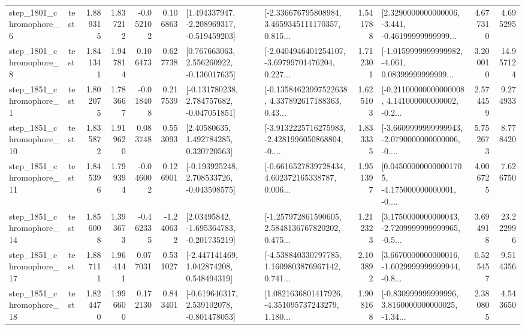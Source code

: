 \begin{tabular}{llrrrrllrlrr}
  step\_1801\_chromophore\_6 &      test &      1.889315 &    1.837212 &     -0.052102 &  0.106863 &   [1.494337947, -2.208969317, -0.519459203] &  [-2.336676795808984, 3.4659345111170357, 0.815... &       1.541788 &  [2.3290000000000006, -3.441, -0.46199999999999... &            4.677310 &          4.695295 \\
  step\_1801\_chromophore\_8 &      test &      1.841341 &    1.947814 &      0.106473 &  0.627738 &    [0.767663063, 2.556260922, -0.136017635] &  [-2.0404946401254107, -3.69799701476204, 0.227... &       1.712301 &  [-1.0159999999999982, -4.061, 0.08399999999999... &            3.200010 &         14.957124 \\
  step\_1851\_chromophore\_1 &      test &      1.802075 &    1.783667 &     -0.018408 &  0.217539 &   [-0.131780238, 2.784757682, -0.047051851] &  [-0.13584623997522638, 4.337892617188363, 0.43... &       1.625103 &  [-0.21100000000000008, 4.141000000000002, -0.2... &            2.574459 &          9.274933 \\
 step\_1851\_chromophore\_10 &      test &      1.835872 &    1.919620 &      0.083748 &  0.553093 &      [2.40580635, 1.492784285, 0.320720563] &  [-3.9132225716275983, -2.4281996050868804, -0.... &       1.833335 &  [-3.6609999999999943, -2.0790000000000006, -0.... &            5.752673 &          8.778420 \\
 step\_1851\_chromophore\_11 &      test &      1.845396 &    1.799394 &     -0.046002 &  0.126901 &   [-0.193925248, 2.708533726, -0.043598575] &  [-0.6616527839728434, 4.602372165338787, 0.006... &       1.951397 &  [0.045000000000001705, -4.175000000000001, -0.... &            4.006725 &          7.626750 \\
 step\_1851\_chromophore\_14 &      test &      1.856008 &    1.393673 &     -0.462335 & -1.240632 &    [2.03495842, -1.695364783, -0.201735219] &  [-1.257972861590605, 2.5848136767820202, 0.475... &       1.212323 &  [3.1750000000000043, -2.7209999999999965, -0.5... &            3.694918 &         23.222996 \\
 step\_1851\_chromophore\_17 &      test &      1.887111 &    1.964141 &      0.077031 &  0.531027 &    [-2.447141469, 1.042874208, 0.548494319] &  [-4.538840330797785, 1.1609803876967142, 0.741... &       2.103892 &  [3.6670000000000016, -1.6029999999999944, -0.8... &            0.525457 &          9.514356 \\
 step\_1851\_chromophore\_18 &      test &      1.824470 &    1.996600 &      0.172130 &  0.843401 &   [-0.619646317, 2.539102078, -0.801478053] &  [1.0821636801417926, -4.351095737243279, 1.180... &       1.908168 &  [-0.830999999999996, 3.8160000000000025, -1.34... &            2.380805 &          4.543650 \\

\end{tabular}
